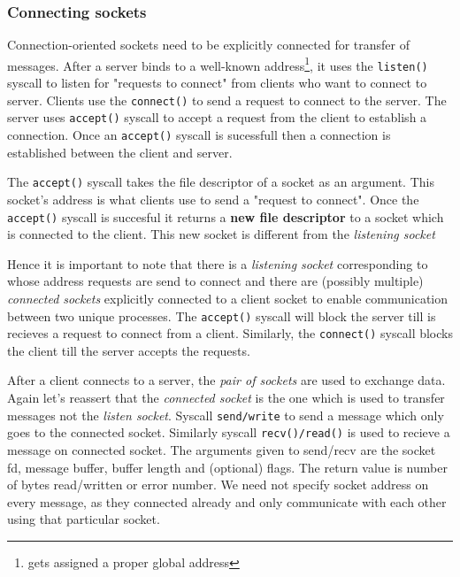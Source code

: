 \documentclass[12pt]{article}
\newcommand{\tbox}[1]{\noindent\fbox{\parbox{\textwidth}{#1}}}
\begin{document}
\noindent\tbox{
    \begin{center}
    \textbf{\Huge Lecture 11}
    \end{center}
}
\subsubsection*{Connecting sockets}
Connection-oriented sockets need to be explicitly connected for transfer of messages.
After a server binds to a well-known address\footnote{gets assigned a proper global address}, it uses the \texttt{listen()} syscall to listen
for "requests to connect" from clients who want to connect to server. Clients use the \texttt{connect()} to send a request to connect to the server. The server
uses \texttt{accept()} syscall to accept a request from the client to establish a connection. Once an \texttt{accept()} syscall is sucessfull then a connection
is established between the client and server. 


The \texttt{accept()} syscall takes the file descriptor of a socket as an argument. This socket's address is what clients use to send a "request to connect".
Once the \texttt{accept()} syscall is succesful it returns a \textbf{new file descriptor} to a socket which is connected to the client. This new socket is different from the \textit{listening socket}

Hence it is important to note that there is a \textit{listening socket} corresponding to whose address requests are send to connect and there are (possibly multiple)
\textit{connected sockets} explicitly connected to a client socket to enable communication between two unique processes. 
The \texttt{accept()} syscall will block the server till is recieves a request to connect from a client. Similarly, the \texttt{connect()} syscall blocks the client till the server accepts the requests.

After a client connects to a server, the \textit{pair of sockets} are used to exchange data. Again let's reassert that the \textit{connected socket} is the one which is used to transfer messages not the \textit{listen socket}.
Syscall \texttt{send/write} to send a message which only goes to the connected socket.
Similarly syscall \texttt{recv()/read()} is used to recieve a message on connected socket. 
The arguments given to send/recv are the socket fd, message buffer, buffer length and (optional) flags.
The return value is number of bytes read/written or error number.
We need not specify socket address on every message, as they connected already and only communicate with each other using that particular socket.
\end{document}
